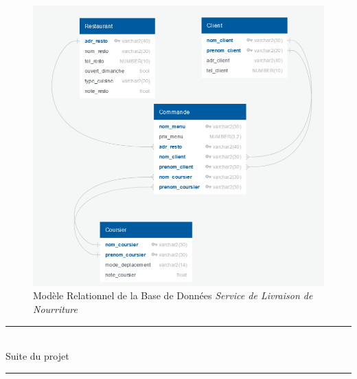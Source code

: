 \documentclass[french]{article}
\begin{document}
            
            \begin{figure}[ht] %
            \includegraphics[width = 15cm]{Image/Modele_Relationnel.png}
            \caption{Modèle Relationnel de la Base de Données \emph{Service de Livraison de Nourriture}}
            \label{image_modele_relationnel}
            \end{figure}
            \newpage
                
        \begin{center}
            \rule{12cm}{0.1pt}\\[10px] 
            Suite du projet\\[5px]
            \rule{12cm}{0.1pt}\\[10px]
        \end{center}
        
                
\end{document}
